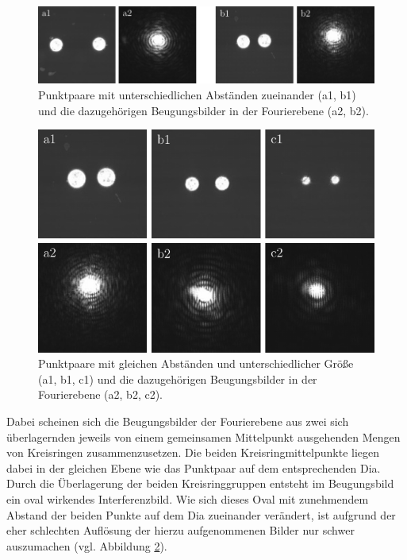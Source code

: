 \begin{figure}[h]
	\centering
	\includegraphics{images/Regina/abb15.pdf}
	\caption[Punktpaare unterschiedlicher Abstände und Fourierspektren]{
		Punktpaare mit unterschiedlichen Abständen zueinander (a1, b1) und die dazugehörigen Beugungsbilder in der Fourierebene (a2, b2).
	}
	\label{fig:punktpaare_verschieden_und_spektren}
\end{figure}

\begin{figure}[h]
	\centering
	\includegraphics{images/Regina/abb16.pdf}
	\caption[Punktpaare gleicher Abstände und Fourierspektren]{
		Punktpaare mit gleichen Abständen und unterschiedlicher Größe (a1, b1, c1) und die dazugehörigen Beugungsbilder in der Fourierebene (a2, b2, c2).
	}
	\label{fig:punktpaare_gleich_und_spektren}
\end{figure}

Dabei scheinen sich die Beugungsbilder der Fourierebene aus zwei sich überlagernden jeweils von einem gemeinsamen Mittelpunkt ausgehenden Mengen von Kreisringen zusammenzusetzen. Die beiden Kreisringmittelpunkte liegen dabei in der gleichen Ebene wie das Punktpaar auf dem entsprechenden Dia. Durch die Überlagerung der beiden Kreisringgruppen entsteht im Beugungsbild ein oval wirkendes Interferenzbild. Wie sich dieses Oval mit zunehmendem Abstand der beiden Punkte auf dem Dia zueinander verändert, ist aufgrund der eher schlechten Auflösung der hierzu aufgenommenen Bilder nur schwer auszumachen (vgl. Abbildung \ref{fig:punktpaare_gleich_und_spektren}). 


